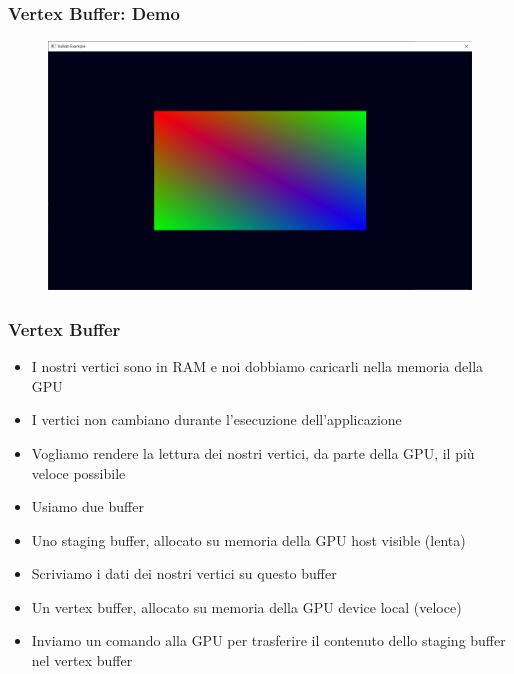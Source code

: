 \begin{frame}
\frametitle{Vertex Buffer: Demo}
\begin{figure}[ht]
    \centering
    \includegraphics[scale=0.25]{images/SlidesVertices/RenderQuad.png}
\end{figure}
\end{frame}

\begin{frame}
\frametitle{Vertex Buffer}
\begin{itemize}
\item I nostri vertici sono in RAM e noi dobbiamo caricarli nella memoria della GPU
\item I vertici non cambiano durante l'esecuzione dell'applicazione
\item Vogliamo rendere la lettura dei nostri vertici, da parte della GPU, il più veloce possibile
\item Usiamo due buffer
\item Uno staging buffer, allocato su memoria della GPU host visible (lenta)
\item Scriviamo i dati dei nostri vertici su questo buffer
\item Un vertex buffer, allocato su memoria della GPU device local (veloce)
\item Inviamo un comando alla GPU per trasferire il contenuto dello staging buffer nel vertex buffer
\end{itemize}
\end{frame}
